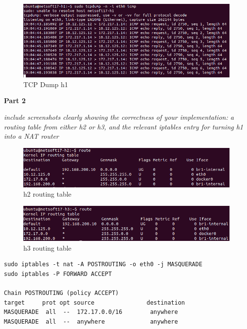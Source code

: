 \documentclass[12pt]{article}
\begin{document}
\begin{figure}[h]
	\centering
	\includegraphics[scale=0.5]{tcpdump-h1}
	\caption{TCP Dump h1}
\end{figure}

\vspace{5mm} 
\textbf{Part 2}

\vspace{2mm} 
\textit{include screenshots clearly showing the correctness of your implementation: 
	a routing table from either h2 or h3, and the relevant iptables entry for
	turning h1 into a NAT router}
\vspace{2mm} 

\begin{figure}[h]
	\centering
	\includegraphics[scale=0.5]{h2-route-table}
	\caption{h2 routing table}
\end{figure}

\begin{figure}[h]
	\centering
	\includegraphics[scale=0.5]{h3-route-table}
	\caption{h3 routing table}
\end{figure}


\begin{verbatim}
sudo iptables -t nat -A POSTROUTING -o eth0 -j MASQUERADE
sudo iptables -P FORWARD ACCEPT

Chain POSTROUTING (policy ACCEPT)
target     prot opt source               destination
MASQUERADE  all  --  172.17.0.0/16        anywhere
MASQUERADE  all  --  anywhere             anywhere
\end{verbatim}
\end{document}
